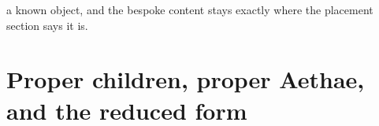 a known object, and the bespoke content stays exactly where the placement section says it is.

\section{Proper children, proper Aethae, and the reduced form}
\label{sec:reduced}

